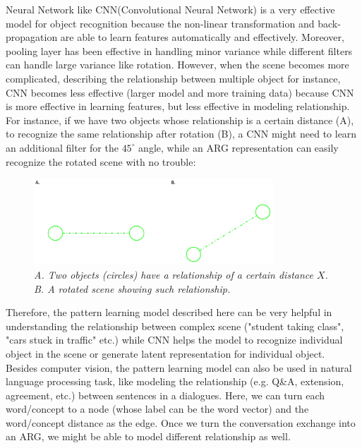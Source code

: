 Neural Network like CNN(Convolutional Neural Network) is a very effective model for object recognition because the non-linear transformation and back-propagation are able to learn features automatically and effectively. Moreover, pooling layer has been effective in handling minor variance while different filters can handle large variance like rotation\footnotemark. However, when the scene becomes more complicated, describing the relationship between multiple object for instance, CNN becomes less effective (larger model and more training data) because CNN is more effective in learning features, but less effective in modeling relationship. For instance, if we have two objects whose relationship is a certain distance (A), to recognize the same relationship after rotation (B), a CNN might need to learn an additional filter for the $45^\circ$ angle, while an ARG representation can easily recognize the rotated scene with no trouble:\\

\begin{figure}[h]
	\centering
	\captionsetup{justification=centering}
	\includegraphics[width=0.8\textwidth]{figs/rotation.png}
	\caption[Caption for LOF]{\emph{A. Two objects (circles) have a relationship of a certain distance $X$.\\ B. A rotated scene showing such relationship. }}
	\label{fig:rotation}
\end{figure}

Therefore, the pattern learning model described here can be very helpful in understanding the relationship between complex scene ("student taking class", "cars stuck in traffic" etc.) while CNN helps the model to recognize individual object in the scene or generate latent representation for individual object.\\

Besides computer vision, the pattern learning model can also be used in natural language processing task, like modeling the relationship (e.g. Q\&A, extension, agreement, etc.) between sentences in a dialogues. Here, we can turn each word/concept to a node (whose label can be the word vector) and the word/concept distance as the edge. Once we turn the conversation exchange into an ARG, we might be able to model different relationship as well.\\

